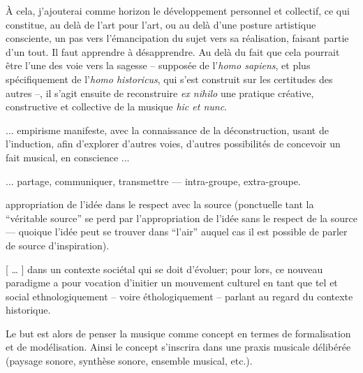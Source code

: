 \documentclass{article}
\newcommand{\footref}[1]{%
  \enotezwritemark{\enmarkstyle\ref{#1}}%
}
\begin{document}
\bigskip

À cela, j'ajouterai comme horizon le développement personnel et collectif, ce qui constitue, au delà de l'art pour l'art, ou au delà d'une posture artistique consciente, un pas vers l'émancipation du sujet vers sa réalisation, faisant partie d'un tout. Il faut apprendre à désapprendre. 
Au delà du fait que cela pourrait être l'une des voie vers la sagesse -- supposée de l'\textit{homo sapiens}, et plus spécifiquement de l'\textit{homo historicus}, qui s'est construit sur les certitudes des autres --, il s'agit ensuite de reconstruire \textit{ex nihilo} une pratique créative, constructive et collective de la musique \textit{hic et nunc}. 

... empirisme manifeste, avec la connaissance de la déconstruction, usant de l'induction, afin d'explorer d'autres voies, d'autres possibilités de concevoir un fait musical, en conscience ...

... partage, communiquer, transmettre --- intra-groupe, extra-groupe.

appropriation de l’idée dans le respect avec la source (ponctuelle tant la “véritable source” se perd par l’appropriation de l’idée sans le respect de la source — quoique l’idée peut se trouver dans “l’air” auquel cas il est possible de parler de source d’inspiration).


\bigskip


[ … ] dans un contexte sociétal qui se doit d'évoluer; pour lors, ce nouveau paradigme a pour vocation d'initier un mouvement culturel en tant que tel et social ethnologiquement -- voire éthologiquement -- parlant au regard du contexte historique.%


Le but est alors de penser la musique comme concept en termes de formalisation et de modélisation. Ainsi le concept s’inscrira dans une praxis%
musicale délibérée (paysage sonore, synthèse sonore, ensemble musical, etc.).
\end{document}
